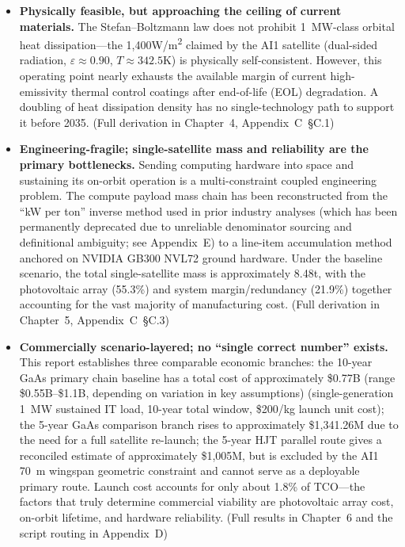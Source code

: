 \begin{itemize}[leftmargin=*]
    \item \textbf{Physically feasible, but approaching the ceiling of current materials.} The Stefan--Boltzmann law does not prohibit 1~MW-class orbital heat dissipation---the 1,400\;W/m\textsuperscript{2} claimed by the AI1 satellite (dual-sided radiation, $\varepsilon\approx0.90$, $T\approx342.5$\;K) is physically self-consistent. However, this operating point nearly exhausts the available margin of current high-emissivity thermal control coatings after end-of-life (EOL) degradation. A doubling of heat dissipation density has no single-technology path to support it before 2035. (Full derivation in Chapter~4, Appendix~C~\S C.1)

    \item \textbf{Engineering-fragile; single-satellite mass and reliability are the primary bottlenecks.} Sending computing hardware into space and sustaining its on-orbit operation is a multi-constraint coupled engineering problem. The compute payload mass chain has been reconstructed from the ``kW per ton'' inverse method used in prior industry analyses (which has been permanently deprecated due to unreliable denominator sourcing and definitional ambiguity; see Appendix~E) to a line-item accumulation method anchored on NVIDIA GB300 NVL72 ground hardware. Under the baseline scenario, the total single-satellite mass is approximately 8.48\;t, with the photovoltaic array (55.3\%) and system margin/redundancy (21.9\%) together accounting for the vast majority of manufacturing cost. (Full derivation in Chapter~5, Appendix~C~\S C.3)

    \item \textbf{Commercially scenario-layered; no ``single correct number'' exists.} This report establishes three comparable economic branches: the 10-year GaAs primary chain baseline has a total cost of approximately \$0.77B (range \$0.55B--\$1.1B, depending on variation in key assumptions) (single-generation 1~MW sustained IT load, 10-year total window, \$200/kg launch unit cost); the 5-year GaAs comparison branch rises to approximately \$1,341.26M due to the need for a full satellite re-launch; the 5-year HJT parallel route gives a reconciled estimate of approximately \$1,005M, but is excluded by the AI1 70~m wingspan geometric constraint and cannot serve as a deployable primary route. Launch cost accounts for only about 1.8\% of TCO---the factors that truly determine commercial viability are photovoltaic array cost, on-orbit lifetime, and hardware reliability. (Full results in Chapter~6 and the script routing in Appendix~D)
\end{itemize}

